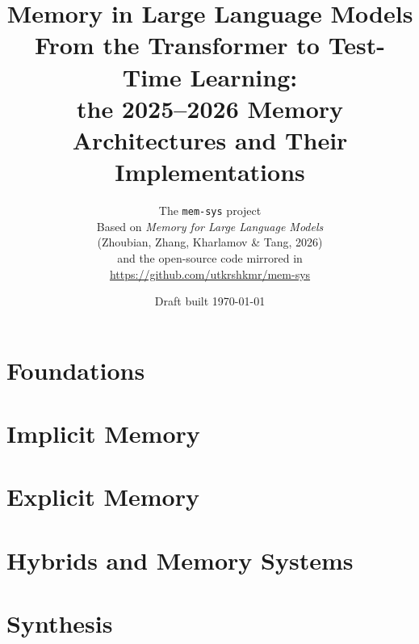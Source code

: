 \documentclass[11pt,twoside,openright]{book}
\title{%
  {\Huge\bfseries Memory in Large Language Models}\\[0.8em]
  {\Large From the Transformer to Test-Time Learning:\\
  the 2025--2026 Memory Architectures and Their Implementations}}
\author{The \texttt{mem-sys} project\\[1em]
  \normalsize Based on \emph{Memory for Large Language Models}\\
  \normalsize (Zhoubian, Zhang, Kharlamov \& Tang, 2026)\\
  \normalsize and the open-source code mirrored in\\
  \normalsize\url{https://github.com/utkrshkmr/mem-sys}}
\date{Draft built \today}
\begin{document}
\frontmatter
\maketitle

\setcounter{tocdepth}{1}
\tableofcontents

\mainmatter

\part{Foundations}




\part{Implicit Memory}






\part{Explicit Memory}




\part{Hybrids and Memory Systems}



\part{Synthesis}


\appendix


\backmatter


\end{document}
